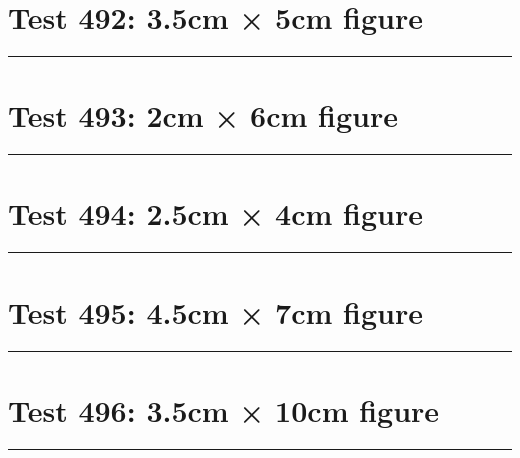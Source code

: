 \documentclass[a4paper,11pt]{article}
\begin{document}
\section*{Test 492: 3.5cm × 5cm figure}
\begin{swarmwrap}%
  \begin{minipage}[t]{3cm}
    \centering
    \rule{\linewidth}{5cm}
  \end{minipage}%
\end{swarmwrap}%
\swarmwrapnext
\lipsum[26]
\lipsum[27]
\lipsum[28]
\lipsum[29]
\section*{Test 493: 2cm × 6cm figure}
\begin{swarmwrap}%
  \begin{minipage}[t]{2cm}
    \centering
    \rule{\linewidth}{6cm}
  \end{minipage}%
\end{swarmwrap}%
\swarmwrapnext
\lipsum[109]
\lipsum[110]
\lipsum[111]
\lipsum[112]
\lipsum[113]
\lipsum[114]
\section*{Test 494: 2.5cm × 4cm figure}
\begin{swarmwrap}%
  \begin{minipage}[t]{2cm}
    \centering
    \rule{\linewidth}{4cm}
  \end{minipage}%
\end{swarmwrap}%
\swarmwrapnext
\lipsum[149]
\lipsum[150]
\lipsum[1]
\lipsum[2]
\lipsum[3]
\section*{Test 495: 4.5cm × 7cm figure}
\begin{swarmwrap}%
  \begin{minipage}[t]{4cm}
    \centering
    \rule{\linewidth}{7cm}
  \end{minipage}%
\end{swarmwrap}%
\swarmwrapnext
\lipsum[42]
\lipsum[43]
\lipsum[44]
\lipsum[45]
\section*{Test 496: 3.5cm × 10cm figure}
\begin{swarmwrap}%
  \begin{minipage}[t]{3cm}
    \centering
    \rule{\linewidth}{10cm}
  \end{minipage}%
\end{swarmwrap}%
\swarmwrapnext
\lipsum[129]
\lipsum[130]
\lipsum[131]
\lipsum[132]
\lipsum[133]
\lipsum[134]
\end{document}
